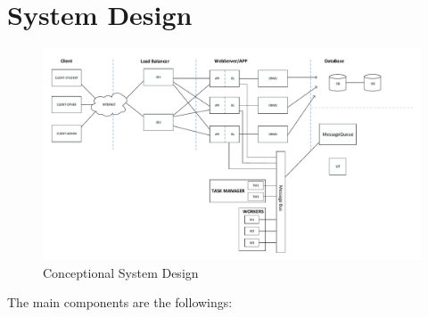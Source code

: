 \section{System Design}

\begin{figure}[!ht]
	\includegraphics[width=\textwidth]{figures/atfogo_rendszerterv_teljes.pdf}
	\caption{Conceptional System Design}
	\label{fig:conceptional-system-design}
\end{figure}


The main components are the followings:

